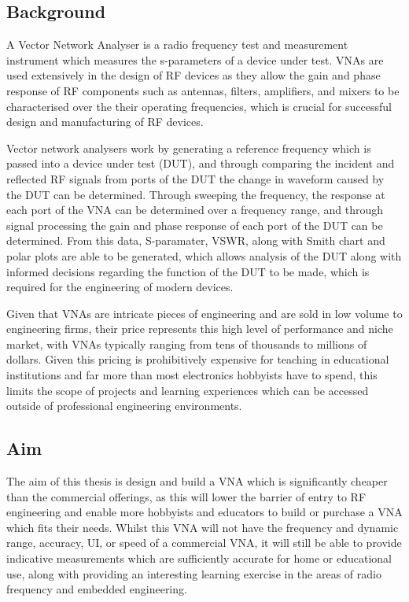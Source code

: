 \subsection{Background}
A Vector Network Analyser is a radio frequency test and measurement instrument which measures the s-parameters of a device under test. VNAs are used extensively in the design of RF devices as they allow the gain and phase response of RF components such as antennas, filters, amplifiers, and mixers to be characterised over the their operating frequencies, which is crucial for successful design and manufacturing of RF devices.

Vector network analysers work by generating a reference frequency which is passed into a device under test (DUT), and through comparing the incident and reflected RF signals from ports of the DUT the change in waveform caused by the DUT can be determined. Through sweeping the frequency, the response at each port of the VNA can be determined over a frequency range, and through signal processing the gain and phase response of each port of the DUT can be determined. From this data, S-paramater, VSWR, along with Smith chart and polar plots are able to be generated, which allows analysis of the DUT along with informed decisions regarding the function of the DUT to be made, which is required for the engineering of modern devices. 

Given that VNAs are intricate pieces of engineering and are sold in low volume to engineering firms, their price represents this high level of performance and niche market, with VNAs typically ranging from tens of thousands to millions of dollars. Given this pricing is prohibitively expensive for teaching in educational institutions and far more than most electronics hobbyists have to spend, this limits the scope of projects and learning experiences which can be accessed outside of professional engineering environments. 

\subsection{Aim}
The aim of this thesis is design and build a VNA which is significantly cheaper than the commercial offerings, as this will lower the barrier of entry to RF engineering and enable more hobbyists and educators to build or purchase a VNA which fits their needs. Whilst this VNA will not have the frequency and dynamic range, accuracy, UI, or speed of a commercial VNA, it will still be able to provide indicative measurements which are sufficiently accurate for home or educational use, along with providing an interesting learning exercise in the areas of radio frequency and embedded engineering.  

